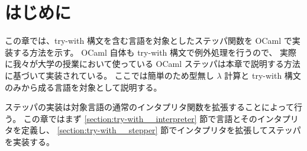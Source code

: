 \section{はじめに}
\label{section:try-with__intro}

この章では、try-with 構文を含む言語を対象としたステッパ関数を
OCaml で実装する方法を示す。
OCaml 自体も try-with 構文で例外処理を行うので、
実際に我々が大学の授業において使っている OCaml ステッパは本章で説明する方法に基づいて実装されている。
ここでは簡単のため型無し $\lambda$ 計算と try-with 構文のみから成る言語を対象として説明する。

ステッパの実装は対象言語の通常のインタプリタ関数を拡張することによって行う。
この章ではまず \ref{section:try-with__interpreter} 節で言語とそのインタプリタを定義し、
\ref{section:try-with__stepper} 節でインタプリタを拡張してステッパを実装する。
